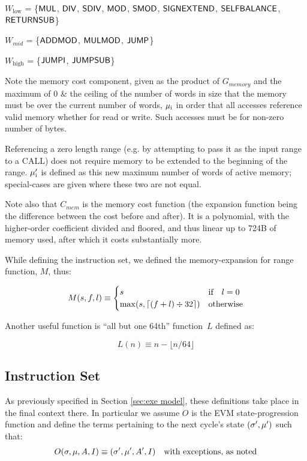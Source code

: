 $W_{\mathrm{low}}$ = \{$\mathsf{MUL}$, $\mathsf{DIV}$, $\mathsf{SDIV}$, $\mathsf{MOD}$, $\mathsf{SMOD}$, $\mathsf{SIGNEXTEND}$, $\mathsf{SELFBALANCE}$, $\mathsf{RETURNSUB}$\}

$W_{mid}$ = \{$\mathsf{ADDMOD}$, $\mathsf{MULMOD}$, $\mathsf{JUMP}$\}

$W_{\mathrm{high}}$ = \{$\mathsf{JUMPI}$, $\mathsf{JUMPSUB}$\}

Note the memory cost component, given as the product of $G_{memory}$ and the maximum of 0 \& the ceiling of the number of words in size that the memory must be over the current number of words, $\mathbf{\mu}_{\mathrm{i}}$ in order that all accesses reference valid memory whether for read or write. Such accesses must be for non-zero number of bytes.

Referencing a zero length range (e.g. by attempting to pass it as the input range to a CALL) does not require memory to be extended to the beginning of the range. $\mathbf{\mu}'_{\mathrm{i}}$ is defined as this new maximum number of words of active memory; special-cases are given where these two are not equal.

Note also that $C_{mem}$ is the memory cost function (the expansion function being the difference between the cost before and after). It is a polynomial, with the higher-order coefficient divided and floored, and thus linear up to 724B of memory used, after which it costs substantially more.

While defining the instruction set, we defined the memory-expansion for range function, $M$, thus:

\begin{equation}
M(s, f, l) \equiv \begin{cases}
s & \text{if} \quad l = 0 \\
\max(s, {\left\lceil{ (f + l) \div 32 } \right\rceil}) & \text{otherwise}
\end{cases}
\end{equation}

Another useful function is ``all but one 64th'' function~$L$ defined as:

\begin{equation}
L(n) \equiv n - \lfloor n / 64 \rfloor
\end{equation}

\subsection{Instruction Set}
\label{app:instruction-set}

As previously specified in Section \ref{sec:exe model}, these definitions take place in the final context there. In particular we assume $O$ is the EVM state-progression function and define the terms pertaining to the next cycle's state $(\mathbf{\sigma}', \mathbf{\mu}')$ such that:
\begin{equation}
O(\mathbf{\sigma}, \mathbf{\mu}, A, I) \equiv (\mathbf{\sigma}', \mathbf{\mu}', A', I) \quad \text{with exceptions, as noted}
\end{equation}

